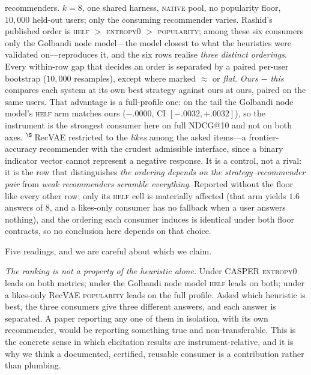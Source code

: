 \documentclass[11pt]{article}
\begin{document}
\begin{table}[!htbp]
{{recommenders.} $k{=}8$, one shared harness, \textsc{native} pool, no popularity floor, $10{,}000$ held-out
users; only the consuming recommender varies. Rashid's published order is \textsc{helf} $>$
\textsc{entropy0} $>$ \textsc{popularity}; among these six consumers only the Golbandi node model---the model closest
to what the heuristics were validated on---reproduces it, and the six rows realise \emph{three distinct
orderings}. Every within-row gap that decides an order is separated by a paired per-user bootstrap
($10{,}000$ resamples), except where marked $\approx$ or \emph{flat}. \emph{Ours $-$ this} compares each system at
its own best strategy against ours at ours, paired on the same users. That advantage is a full-profile
one: on the tail the Golbandi node model's \textsc{helf} arm matches ours ($-.0000$, CI
$[-.0032,+.0032]$), so the instrument is the strongest consumer here on full NDCG@10 and not on both axes.
$^{\S}$\,RecVAE restricted to the \emph{likes} among the asked items---a frontier-accuracy recommender with the
crudest admissible interface, since a binary indicator vector cannot represent a negative response. It is a control, not a rival:
it is the row that distinguishes \emph{the ordering depends on the strategy--recommender pair} from \emph{weak
recommenders scramble everything}. Reported without the floor like every other row; only its \textsc{helf} cell is
materially affected (that arm yields $1.6$ answers of $8$, and a likes-only consumer has no fallback when a user
answers nothing), and the ordering each consumer induces is identical under both floor contracts, so no conclusion
here depends on that choice.}
\label{tab:instrdep}
\end{table}

Five readings, and we are careful about which we claim.

\emph{The ranking is not a property of the heuristic alone.} Under CASPER \textsc{entropy0} leads on both
metrics; under the Golbandi node model \textsc{helf} leads on both; under a likes-only RecVAE
\textsc{popularity} leads on the full profile. Asked which heuristic is best, the three consumers give three
different answers, and each answer is separated. A paper reporting any one of them in isolation, with its own
recommender, would be reporting something true and non-transferable. This is the concrete sense in
which elicitation results are instrument-relative, and it is why we think a documented, certified, reusable
consumer is a contribution rather than plumbing.
\end{document}

